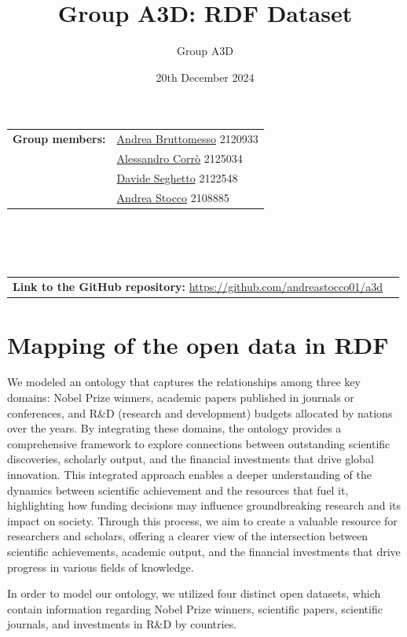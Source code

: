 \documentclass{article}
\title{Group A3D: RDF Dataset}
\author{Group A3D}
\date{20th December 2024}
\begin{document}
\maketitle

\noindent\begin{tabular}{@{}ll}
	\textbf{Group members:}
  & \href{mailto:andrea.bruttomesso.1@studenti.unipd.it}{Andrea Bruttomesso} 2120933\\
	& \href{mailto:alessandro.corro.1@studenti.unipd.it}{Alessandro Corr\`o} 2125034\\
	& \href{mailto:davide.seghetto@studenti.unipd.it}{Davide Seghetto} 2122548\\
	& \href{mailto:andrea.stocco.8@studenti.unipd.it}{Andrea Stocco} 2108885\\
\end{tabular}
\\\\\\
\noindent\begin{tabular}{@{}ll}
	\textbf{Link to the GitHub repository:} \href{https://github.com/andreastocco01/a3d}{https://github.com/andreastocco01/a3d}
\end{tabular}

\section*{Mapping of the open data in RDF}
We modeled an ontology that captures the relationships among three key domains: Nobel Prize winners, academic papers published in journals or conferences,
and R\&D (research and development) budgets allocated by nations over the years. By integrating these domains, the ontology provides a comprehensive
framework to explore connections between outstanding scientific discoveries, scholarly output, and the financial investments that drive global innovation.
This integrated approach enables a deeper understanding of the dynamics between scientific achievement and the resources that fuel it, highlighting how
funding decisions may influence groundbreaking research and its impact on society. Through this process, we aim to create a valuable resource for
researchers and scholars, offering a clearer view of the intersection between scientific achievements, academic output, and the financial investments
that drive progress in various fields of knowledge.

\noindent In order to model our ontology, we utilized four distinct open
datasets, which contain information regarding Nobel Prize winners, scientific papers, scientific journals, and investments in R\&D by countries.
\end{document}
